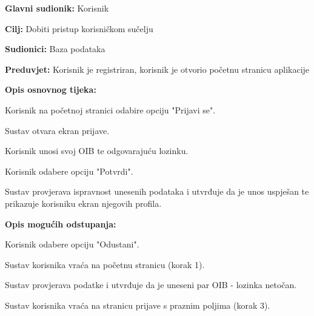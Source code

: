 					\noindent {}
					\begin{packed_item}
						
						\item \textbf{Glavni sudionik: }Korisnik
						\item  \textbf{Cilj:} Dobiti pristup korisničkom sučelju
						\item  \textbf{Sudionici:} Baza podataka
						\item  \textbf{Preduvjet:} Korisnik je registriran, korisnik je otvorio početnu stranicu aplikacije
						\item  \textbf{Opis osnovnog tijeka:}
						
						\item[] \begin{packed_enum}
							
							\item Korisnik na početnoj stranici odabire opciju "Prijavi se".
							\item Sustav otvara ekran prijave.
							\item Korisnik unosi svoj OIB te odgovarajuću lozinku.
							\item Korisnik odabere opciju "Potvrdi".
							\item Sustav provjerava ispravnost unesenih podataka i utvrđuje da je unos uspješan te prikazuje korisniku ekran njegovih profila.
						\end{packed_enum}
						
						\item  \textbf{Opis mogućih odstupanja:}
						
						\item[] \begin{packed_item}
							
							\item[4.a] Korisnik odabere opciju "Odustani".
							\item[] \begin{packed_enum}
								
								\item Sustav korisnika vraća na početnu stranicu (korak 1).
		
								
							\end{packed_enum}
							
							\item[5.a] Sustav provjerava podatke i utvrđuje da je uneseni par OIB - lozinka netočan.
							\item[] \begin{packed_enum}
								
								\item Sustav korisnika vraća na stranicu prijave s praznim poljima (korak 3).
								
								
							\end{packed_enum}
							
						\end{packed_item}
					\end{packed_item}
					
